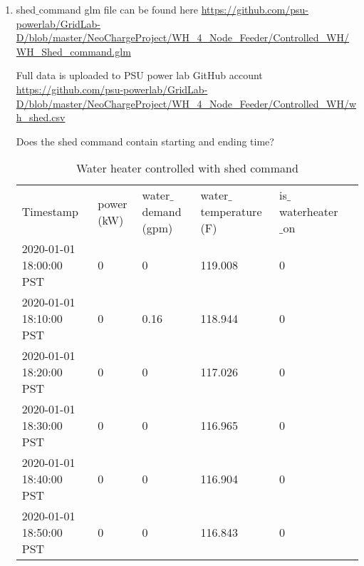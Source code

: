 \begin{enumerate}
        \item shed$\_$command \newline
        glm file can be found here \url{https://github.com/psu-powerlab/GridLab-D/blob/master/NeoChargeProject/WH_4_Node_Feeder/Controlled_WH/WH_Shed_command.glm} \newline \par
         Full data is uploaded to PSU power lab GitHub account \url{https://github.com/psu-powerlab/GridLab-D/blob/master/NeoChargeProject/WH_4_Node_Feeder/Controlled_WH/wh_shed.csv}\newline \par Does the shed command contain starting and ending time? 
        
        \begin{table}[h]
        \begin{tabular}{|l|l|l|l|l|l}
        \cline{1-5}
        Timestamp & power (kW) & water$\_$demand (gpm) & water$\_$temperature (F) & is$\_$waterheater$\_$on & \\ \cline{1-5}
        2020-01-01 18:00:00 PST & 0 & 0 & 119.008 & 0 & \\ \cline{1-5}
        2020-01-01 18:10:00 PST & 0 & 0.16 & 118.944 & 0 &  \\ \cline{1-5}
        2020-01-01 18:20:00 PST & 0 & 0 & 117.026 & 0 &  \\ \cline{1-5}
        2020-01-01 18:30:00 PST & 0 & 0 & 116.965 & 0 &  \\ \cline{1-5}
        2020-01-01 18:40:00 PST & 0 & 0 & 116.904 & 0 &  \\ \cline{1-5}
        2020-01-01 18:50:00 PST & 0 & 0 & 116.843 & 0 &  \\
        \cline{1-5}
        \end{tabular}
        \caption{Water heater controlled with shed command}
        \label{table:3}
        \end{table}
    \end{enumerate}
